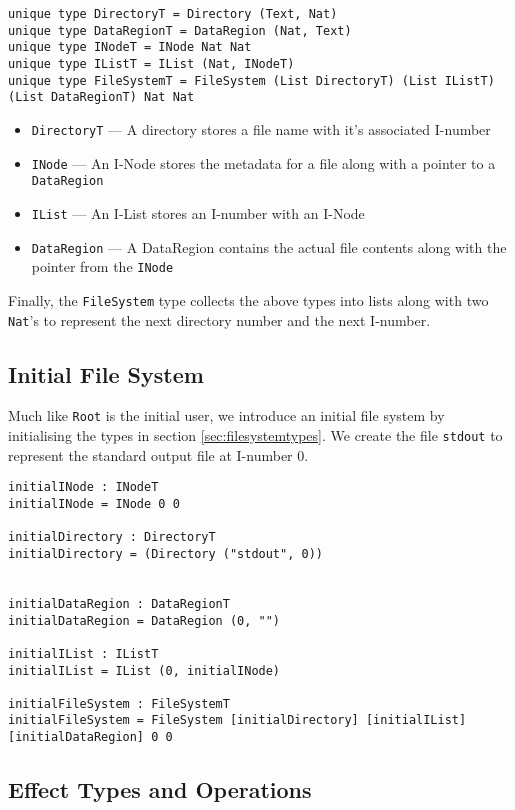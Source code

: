 \documentclass[logo,bsc,singlespacing,parskip]{infthesis}
\begin{document}
\begin{lstlisting}[language=unison]
unique type DirectoryT = Directory (Text, Nat)
unique type DataRegionT = DataRegion (Nat, Text)
unique type INodeT = INode Nat Nat
unique type IListT = IList (Nat, INodeT)
unique type FileSystemT = FileSystem (List DirectoryT) (List IListT) (List DataRegionT) Nat Nat
\end{lstlisting}

\begin{itemize}
  \item{\texttt{DirectoryT} --- A directory stores a file name with it's associated I-number}
  \item{\texttt{INode} --- An I-Node stores the metadata for a file along with a pointer to a \texttt{DataRegion}}
  \item{\texttt{IList} --- An I-List stores an I-number with an I-Node}
  \item{\texttt{DataRegion} --- A DataRegion contains the actual file contents along with the pointer from the \texttt{INode}}
\end{itemize}

Finally, the \texttt{FileSystem} type collects the above types into lists along with two \texttt{Nat}'s to represent the next directory number and the next I-number.

\subsection{Initial File System}

Much like \texttt{Root} is the initial user, we introduce an initial file
system by initialising the types in section \ref{sec:filesystemtypes}. We
create the file \texttt{stdout} to represent the standard output file at
I-number 0.

\begin{lstlisting}[language=unison]
initialINode : INodeT
initialINode = INode 0 0

initialDirectory : DirectoryT
initialDirectory = (Directory ("stdout", 0))


initialDataRegion : DataRegionT
initialDataRegion = DataRegion (0, "")

initialIList : IListT
initialIList = IList (0, initialINode)

initialFileSystem : FileSystemT
initialFileSystem = FileSystem [initialDirectory] [initialIList] [initialDataRegion] 0 0
\end{lstlisting}

\subsection{Effect Types and Operations}
\end{document}
